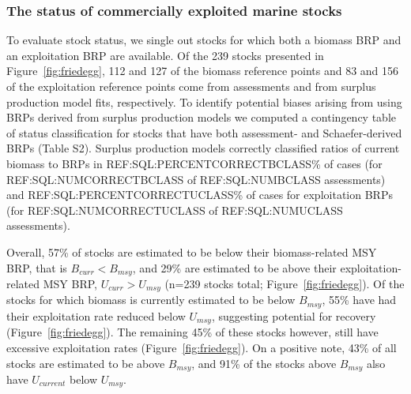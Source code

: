 
\subsubsection*{The status of commercially exploited marine stocks }
To evaluate stock status, we single out stocks for which both a biomass
BRP and an exploitation BRP are available. Of the
239 stocks presented in
Figure~\ref{fig:friedegg}, 112 and
127 of the biomass reference points and
83 and
156 of the exploitation reference
points come from assessments and from surplus production model fits,
respectively.  To identify potential biases arising from using BRPs
derived from surplus production models we computed a contingency table
of status classification for stocks that have both assessment- and
Schaefer-derived BRPs (Table S2). Surplus production models correctly
classified ratios of current biomass to BRPs in
REF:SQL:PERCENTCORRECTBCLASS\% of cases (for REF:SQL:NUMCORRECTBCLASS
of REF:SQL:NUMBCLASS assessments) and REF:SQL:PERCENTCORRECTUCLASS\%
of cases for exploitation BRPs (for REF:SQL:NUMCORRECTUCLASS of
REF:SQL:NUMUCLASS assessments).



Overall, 57\% of stocks are estimated
to be below their biomass-related MSY BRP, that is $B_{curr}<B_{msy}$,
and 29\% are estimated to be above
their exploitation-related MSY BRP, $U_{curr}>U_{msy}$
(n=239 stocks total; Figure~\ref{fig:friedegg}).
Of the stocks for which biomass is currently estimated to be below
$B_{msy}$, 55\% have had their
exploitation rate reduced below $U_{msy}$, suggesting potential for
recovery (Figure~\ref{fig:friedegg}). The remaining
45\% of these stocks however,
still have excessive exploitation rates (Figure~\ref{fig:friedegg}).
On a positive note, 43\% of all stocks are
estimated to be above $B_{msy}$, and
91\% of the stocks above
$B_{msy}$ also have $U_{current}$ below $U_{msy}$.



